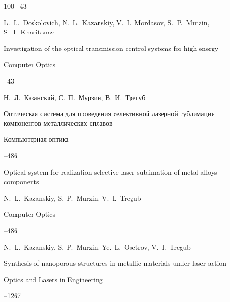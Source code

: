 \begin{thebibliography}{100}
--43

\misctransl

\by L.~L.~Doskolovich, N.~L.~Kazanskiy, V.~I.~Mordasov, S.~P.~Murzin, S.~I.~Kharitonov

\paper Investigation of the optical transmission control systems for high energy

\jour Computer Optics



--43








\by Н.~Л.~Казанский, С.~П.~Мурзин, В.~И.~Трегуб

\paper Оптическая система для проведения селективной лазерной сублимации компонентов металлических сплавов

\jour Компьютерная оптика




--486

\misctransl

\paper Optical system for realization selective laser sublimation of metal alloys components

\by N.~L.~Kazanskiy, S.~P.~Murzin, V.~I.~Tregub

\jour Computer Optics




--486










\by N.~L.~Kazanskiy, S.~P.~Murzin, Ye.~L.~Osetrov, V.~I.~Tregub

\paper Synthesis of nanoporous structures in metallic materials under laser action

\jour Optics and Lasers in Engineering




--1267




\end{thebibliography}
